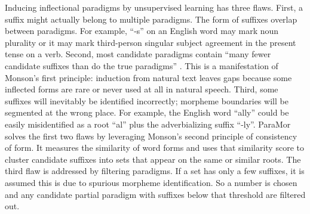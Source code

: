 \documentclass[12pt]{article}
\begin{document}
Inducing inflectional paradigms by unsupervised learning has three flaws. First, a suffix might actually belong to multiple paradigms. The form of suffixes overlap between paradigms. For example, ``-s'' on an English word may mark noun plurality or it may mark third-person singular subject agreement in the present tense on a verb. Second, most candidate paradigms contain ``many fewer candidate suffixes than do the true paradigms'' \cite[page 903]{monson_paramorfinding_2007b}. This is a manifestation of Monson's first principle: induction from natural text leaves gaps because some inflected forms are rare or never used at all in natural speech. Third, some suffixes will inevitably be identified incorrectly; morpheme boundaries will be segmented at the wrong place. For example, the English word ``ally'' could be easily misidentified as a root ``al'' plus the adverbializing suffix  ``-ly''. ParaMor solves the first two flaws by leveraging Monson's second principle of consistency of form. It measures the similarity of word forms and uses that similarity score to cluster candidate suffixes into sets that appear on the same or similar roots. The third flaw is addressed by filtering paradigms. If a set has only a few suffixes, it is assumed this is due to spurious morpheme identification. So a number is chosen and any candidate partial paradigm with suffixes below that threshold are filtered out. 
\end{document}
